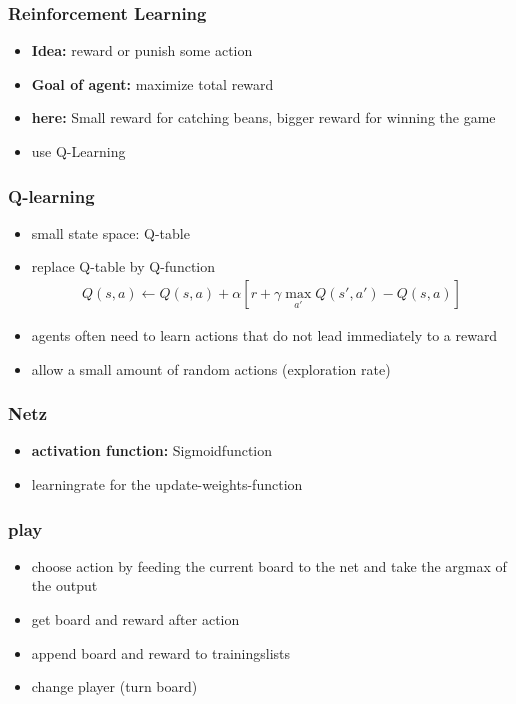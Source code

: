 \documentclass{beamer}
\begin{document}
 \begin{frame}
 \frametitle{Reinforcement Learning}
 \begin{itemize}
 \item \textbf{Idea:} reward or punish some action
 \item \textbf{Goal of agent:} maximize total reward
 \item \textbf{here:} Small reward for catching beans, bigger reward for winning the game
 \item use Q-Learning
 \end{itemize}
 \end{frame}
 
  \begin{frame}
  \frametitle{Q-learning}
 \begin{itemize}
 \item small state space: Q-table
  \item replace Q-table by Q-function 
  \begin{align}
  Q(s,a) \leftarrow Q(s,a)+\alpha [r+\gamma \max_{a'} Q(s',a') -Q(s,a)]
  \end{align}
 \item agents often need to learn actions that do not lead immediately to a reward
 \item allow a small amount of random actions (exploration rate)
 \end{itemize}
 \end{frame}
 
  \begin{frame}
 \frametitle{Netz}
\begin{itemize}
\item \textbf{activation function:} Sigmoidfunction
\item learningrate for the update-weights-function
\end{itemize}
 \end{frame}

 \begin{frame}
 \frametitle{play}
 \begin{itemize}
\item choose action by feeding the current board to the net and take the argmax of the output
\item get board and reward after action 
\item append board and reward to trainingslists
\item change player (turn board)
\end{itemize}
\end{frame}
 
\end{document}
